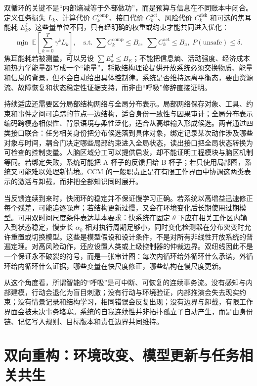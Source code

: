 双循环的关键不是“内部熵减等于外部做功”，而是预算与信息在不同账本中闭合。定义任务损失 $L_k$、计算代价 $C_k^{\mathrm{comp}}$、接口代价 $C_k^{\mathrm{act}}$、风险代价 $C_k^{\mathrm{risk}}$ 和可选的焦耳能耗 $E_k^{\mathrm J}$。这些量单位不同，只有经明确的权重或约束才能共同进入优化：
\[
\min_{\pi}\;\mathbb E\!\left[\sum_{k=0}^{T}\gamma^k L_k\right],\quad
\text{s.t. }\sum C_k^{\mathrm{comp}}\leq B_c,\;
\sum C_k^{\mathrm{act}}\leq B_a,\;
P(\text{unsafe})\leq\delta.
\]
焦耳能耗若被测量，可以另设 $\sum E_k^{\mathrm J}\leq B_E$；不能把信息熵、活动强度、经济成本和热力学能量都写成一个“能量”。耗散结构理论提供开放系统必须交换物质、能量和信息的背景，但不会自动给出具体控制律。系统是否维持远离平衡态，要由资源流、故障恢复和状态稳定性证据支持，而非由“呼吸”修辞直接证明。

持续适应还需要区分局部结构网络与全局分布表示。局部网络保存对象、工具、约束和事件之间可追踪的节点—边结构，适合身份一致性与因果审计；全局分布表示编码跨模态相似性、背景语境与柔性泛化，适合从高维输入形成候选。两者通过四类接口联合：任务相关身份把分布候选落到具体对象，绑定记录某次动作涉及哪些对象与时间，耦合门决定哪些局部约束进入全局状态，读出接口把全局状态转换为可检查的控制变量。人脑区域分工可以提供启发，却不能证明工程模块与脑区机制等同。若绑定失败，系统可能把 A 杯子的反馈归给 B 杯子；若只使用局部图，系统又可能难以处理新情境。CCM 的一般职责正是在有限工作界面中协调这两类表示的激活与卸载，而非把全部知识同时展开。

当反馈连续到来时，快闭环的稳定并不保证慢学习正确。若系统以高增益迅速修正每个残差，可能追逐噪声；若结构更新过慢，又会在环境变化后长期使用过期模型。可用双时间尺度条件表达基本要求：快系统在固定 $\theta$ 下应在相关工作区内输入到状态稳定，慢步长 $\alpha_k$ 相对执行周期足够小，同时变化检测器在分布突变时允许重置或切换模型。这些是模型假设和设计条件，不是对所有非线性开放系统的普遍定理。对高风险动作，还应设置人类或上级控制器的仲裁边界。双纽线因此不是一个保证永不破裂的符号，而是一张审计图：每次内循环给外循环什么承诺，外循环给内循环什么证据，哪些变量在快尺度修正，哪些结构在慢尺度更新。

从这个角度看，所谓智能的“呼吸”是可中断、可恢复的连续事务流。没有感知与内部建模，行动会退化为盲目刺激；没有行动与环境验证，内部推演会失去现实约束；没有情景记录和结构学习，相同错误会反复出现；没有边界与卸载，有限工作界面会被未决事务堵塞。系统的自我连续性并非拓扑孤立子自动产生，而是由身份链、记忆写入规则、目标版本和责任边界共同维持。

\section{双向重构：环境改变、模型更新与任务相关共生}
\label{sec:section_7516}

